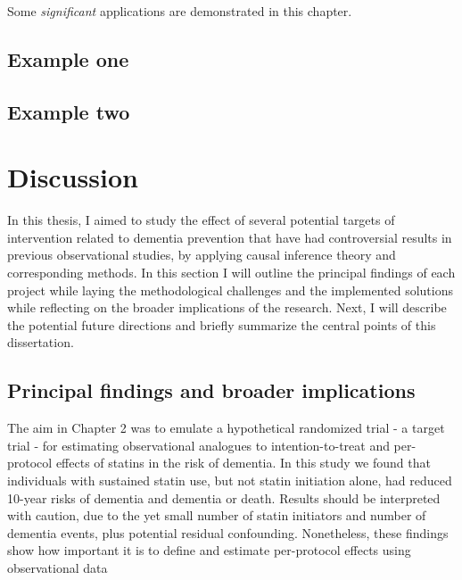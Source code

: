 \documentclass[
]{book}
\begin{document}
Some \emph{significant} applications are demonstrated in this chapter.

\hypertarget{example-one}{%
\section{Example one}\label{example-one}}

\hypertarget{example-two}{%
\section{Example two}\label{example-two}}

\hypertarget{discussion}{%
\chapter{Discussion}\label{discussion}}

In this thesis, I aimed to study the effect of several potential targets of intervention related to dementia prevention that have had controversial results in previous observational studies, by applying causal inference theory and corresponding methods. In this section I will outline the principal findings of each project while laying the methodological challenges and the implemented solutions while reflecting on the broader implications of the research. Next, I will describe the potential future directions and briefly summarize the central points of this dissertation.

\hypertarget{principal-findings-and-broader-implications}{%
\section{Principal findings and broader implications}\label{principal-findings-and-broader-implications}}

The aim in Chapter 2 was to emulate a hypothetical randomized trial - a target trial - for estimating observational analogues to intention-to-treat and per-protocol effects of statins in the risk of dementia. In this study we found that individuals with sustained statin use, but not statin initiation alone, had reduced 10-year risks of dementia and dementia or death. Results should be interpreted with caution, due to the yet small number of statin initiators and number of dementia events, plus potential residual confounding. Nonetheless, these findings show how important it is to define and estimate per-protocol effects using observational data
\end{document}
